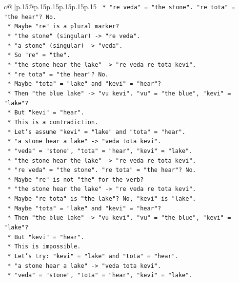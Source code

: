 \documentclass{article}
\begin{document}
{\begin{supertabular}{c@{$\;$}|p{.15\linewidth}@{}p{.15\linewidth}p{.15\linewidth}p{.15\linewidth}p{.15\linewidth}p{.15\linewidth}}
{{{\texttt{    *   "re veda" = "the stone". "re tota" = "the hear"? No.} \\
\texttt{    *   Maybe "re" is a plural marker?} \\
\texttt{    *   "the stone" (singular) {-}> "re veda".} \\
\texttt{    *   "a stone" (singular) {-}> "veda".} \\
\texttt{    *   So "re" = "the".} \\
\texttt{    *   "the stone hear the lake" {-}> "re veda re tota kevi".} \\
\texttt{    *   "re tota" = "the hear"? No.} \\
\texttt{    *   Maybe "tota" = "lake" and "kevi" = "hear"?} \\
\texttt{    *   Then "the blue lake" {-}> "vu kevi". "vu" = "the blue", "kevi" = "lake"?} \\
\texttt{    *   But "kevi" = "hear".} \\
\texttt{    *   This is a contradiction.} \\
\texttt{    *   Let's assume "kevi" = "lake" and "tota" = "hear".} \\
\texttt{    *   "a stone hear a lake" {-}> "veda tota kevi".} \\
\texttt{    *   "veda" = "stone", "tota" = "hear", "kevi" = "lake".} \\
\texttt{    *   "the stone hear the lake" {-}> "re veda re tota kevi".} \\
\texttt{    *   "re veda" = "the stone". "re tota" = "the hear"? No.} \\
\texttt{    *   Maybe "re" is not "the" for the verb?} \\
\texttt{    *   "the stone hear the lake" {-}> "re veda re tota kevi".} \\
\texttt{    *   Maybe "re tota" is "the lake"? No, "kevi" is "lake".} \\
\texttt{    *   Maybe "tota" = "lake" and "kevi" = "hear"?} \\
\texttt{    *   Then "the blue lake" {-}> "vu kevi". "vu" = "the blue", "kevi" = "lake"?} \\
\texttt{    *   But "kevi" = "hear".} \\
\texttt{    *   This is impossible.} \\
\texttt{    *   Let's try: "kevi" = "lake" and "tota" = "hear".} \\
\texttt{    *   "a stone hear a lake" {-}> "veda tota kevi".} \\
\texttt{    *   "veda" = "stone", "tota" = "hear", "kevi" = "lake".} \\
}}}
\end{supertabular}}
\end{document}
